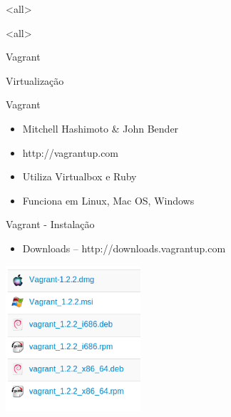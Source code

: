 \documentclass{beamer}
\begin{document}
\mode<all>
{
\begin{frame}[plain]
\end{frame}}
\mode<all>{\usebackgroundtemplate{}}
\mode*

\begin{frame}[plain,c]
  \begin{center}
    \Huge Vagrant
  \end{center}
  \begin{center}
    Virtualização
  \end{center}
\end{frame}

\begin{frame}[fragile]{Vagrant}
  \begin{itemize}
    \item Mitchell Hashimoto \& John Bender
    \item http://vagrantup.com
    \item Utiliza Virtualbox e Ruby
    \item Funciona em Linux, Mac OS, Windows
  \end{itemize}
\end{frame}

\begin{frame}[fragile]{Vagrant - Instalação}
  \begin{itemize}
    \item Downloads -- http://downloads.vagrantup.com
  \end{itemize}
  \begin{center}
    \includegraphics[width=5cm]{images/downloads.png}
  \end{center}
\end{frame}
\end{document}
